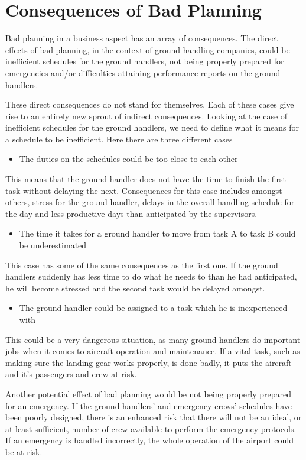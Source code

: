 \section{Consequences of Bad Planning}
Bad planning in a business aspect has an array of consequences. The direct effects of bad planning, in the context of ground handling companies, could be inefficient schedules for the ground handlers, not being properly prepared for emergencies and/or difficulties attaining performance reports on the ground handlers.

These direct consequences do not stand for themselves. Each of these cases give rise to an entirely new sprout of indirect consequences.
Looking at the case of inefficient schedules for the ground handlers, we need to define what it means for a schedule to be inefficient. Here there are three different cases
\begin{itemize}
	\item The duties on the schedules could be too close to each other
\end{itemize}
This means that the ground handler does not have the time to finish the first task without delaying the next. Consequences for this case includes amongst others, stress for the ground handler, delays in the overall handling schedule for the day and less productive days than anticipated by the supervisors.
\begin{itemize}
	\item The time it takes for a ground handler to move from task A to task B could be underestimated
\end{itemize}
This case has some of the same consequences as the first one. If the ground handlers suddenly has less time to do what he needs to than he had anticipated, he will become stressed and the second task would be delayed amongst.
\begin{itemize}
	\item The ground handler could be assigned to a task which he is inexperienced with
\end{itemize}
This could be a very dangerous situation, as many ground handlers do important jobs when it comes to aircraft operation and maintenance. If a vital task, such as making sure the landing gear works properly, is done badly, it puts the aircraft and it's passengers and crew at risk.


Another potential effect of bad planning would be not being properly prepared for an emergency. If the ground handlers' and emergency crews' schedules have been poorly designed, there is an enhanced risk that there will not be an ideal, or at least sufficient, number of crew available to perform the emergency protocols. If an emergency is handled incorrectly, the whole operation of the airport could be at risk.


